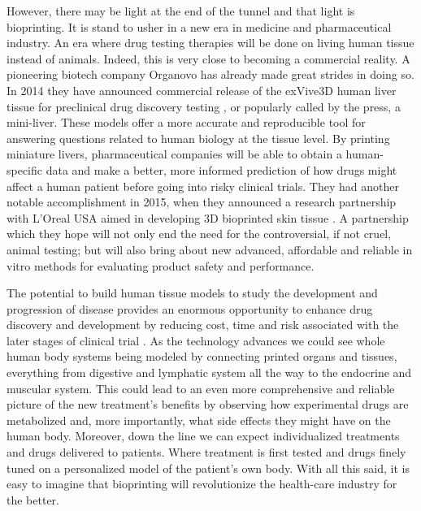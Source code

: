 \documentclass[12pt]{article} %
\begin{document}
However, there may be light at the end of the tunnel and that light is bioprinting. It is stand to usher in a new era in medicine and pharmaceutical industry. An era where drug testing therapies will be done on living human tissue instead of animals. Indeed, this is very close to becoming a commercial reality. A pioneering biotech company Organovo has already made great strides in doing so. In 2014 they have announced commercial release of the exVive3D human liver tissue for preclinical drug discovery testing \cite{Organovo:2014}, or popularly called by the press, a mini-liver. These models offer a more accurate and reproducible tool for answering questions related to human biology at the tissue level\cite{Visk:2015}. By printing miniature livers, pharmaceutical companies will be able to obtain a human-specific data and make a better, more informed prediction of how drugs might affect a human patient before going into risky clinical trials. They had another notable accomplishment in 2015, when they announced a research partnership with  L'Oreal USA aimed in developing 3D bioprinted skin tissue \cite{Organovo:2015}. A partnership which they hope will not only end the need for the controversial, if not cruel, animal testing; but will also bring about new advanced, affordable and reliable in vitro methods for evaluating product safety and performance.

The potential to build human tissue models to study the development and progression of disease provides an enormous opportunity to enhance drug discovery and development by reducing cost, time and risk associated with the later stages of clinical trial \cite{Visk:2015}. As the technology advances we could see whole human body systems being modeled by connecting printed organs and tissues, everything from digestive and lymphatic system all the way to the endocrine and muscular system. This could lead to an even more comprehensive and reliable picture of the new treatment's benefits by observing how experimental drugs are metabolized and, more importantly, what side effects they might have on the human body. Moreover, down the line we can expect individualized treatments and drugs delivered to patients. Where treatment is first tested and drugs finely tuned on a personalized model of the patient's own body. With all this said, it is easy to imagine that bioprinting will revolutionize the health-care industry for the better. 



\newpage 

\end{document}
